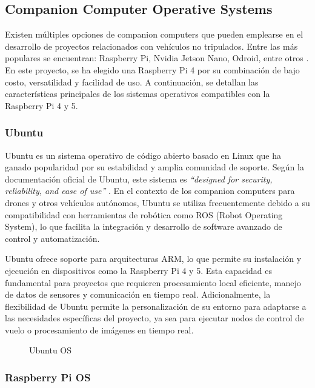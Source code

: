 \subsection{Companion Computer Operative Systems} 
    
    Existen múltiples opciones de companion computers que pueden emplearse en el desarrollo de proyectos relacionados con vehículos no tripulados. Entre las más populares se encuentran: Raspberry Pi, Nvidia Jetson Nano, Odroid, entre otros \cite{electronics_section}. En este proyecto, se ha elegido una Raspberry Pi 4 por su combinación de bajo costo, versatilidad y facilidad de uso. A continuación, se detallan las características principales de los sistemas operativos compatibles con la Raspberry Pi 4 y 5.

    \subsubsection{Ubuntu}

    Ubuntu es un sistema operativo de código abierto basado en Linux que ha ganado popularidad por su estabilidad y amplia comunidad de soporte. Según la documentación oficial de Ubuntu, este sistema es \textit{“designed for security, reliability, and ease of use”} \cite{ubuntu_docs}. En el contexto de los companion computers para drones y otros vehículos autónomos, Ubuntu se utiliza frecuentemente debido a su compatibilidad con herramientas de robótica como ROS (Robot Operating System), lo que facilita la integración y desarrollo de software avanzado de control y automatización.

    Ubuntu ofrece soporte para arquitecturas ARM, lo que permite su instalación y ejecución en dispositivos como la Raspberry Pi 4 y 5. Esta capacidad es fundamental para proyectos que requieren procesamiento local eficiente, manejo de datos de sensores y comunicación en tiempo real. Adicionalmente, la flexibilidad de Ubuntu permite la personalización de su entorno para adaptarse a las necesidades específicas del proyecto, ya sea para ejecutar nodos de control de vuelo o procesamiento de imágenes en tiempo real.

    \begin{figure}[h!] 
    \centering 
    \caption{Ubuntu OS} 
    \label{fig} 
    \end{figure}

    \subsubsection{Raspberry Pi OS}

